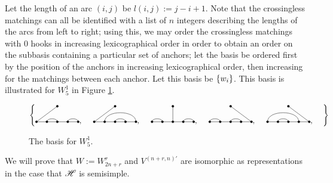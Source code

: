 \documentclass{amsart}
\begin{document}
Let the length of an arc $(i,j)$ be $l(i,j) := j - i + 1$.
Note that the crossingless matchings can all be identified with a list of $n$ integers describing the lengths of the arcs from left to right;
using this, we may order the crossingless matchings with 0 hooks in increasing lexicographical order in order to obtain an order on the subbasis containing a particular set of anchors;
let the basis be ordered first by the position of the anchors in increasing lexicographical order, then increasing for the matchings between each anchor.
Let this basis be $\left\{ w_i \right\}$.
This basis is illustrated for $W_{5}^1$ in Figure \ref{S5 Basis}. 

\begin{figure}
  \def\cbasisspacing{5mm}
  $\cbr{
    \begin{gathered}
      \GeneralizedMatching{5}{2/3, 4/5}{1}{1/1}{3/4}, \hspace{\cbasisspacing}
      \GeneralizedMatching{5}{2/5, 3/4}{1}{1/1}{3/4}, \hspace{\cbasisspacing}
      \GeneralizedMatching{5}{1/2, 4/5}{1}{3/1}{3/4}, \hspace{\cbasisspacing}
      \GeneralizedMatching{5}{1/2, 3/4}{1}{5/1}{3/4}, \hspace{\cbasisspacing}
      \GeneralizedMatching{5}{1/4, 2/3}{1}{5/1}{3/4}, \hspace{\cbasisspacing}
     \end{gathered}}$ 
    \caption{The basis for $W_5^1$.}
  \label{S5 Basis}
\end{figure} 

We will prove that $W := W_{2n+r}^r$ and $V^{(n+r,n)'}$ are isomorphic as representations in the case that $\mathscr{H}$ is semisimple.

\newpage
\end{document}
